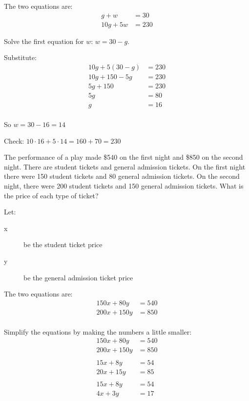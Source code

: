 \documentclass[fleqn,addpoints]{exam}
\begin{document}
\begin{questions}
\begin{solution}[8 cm]
The two equations are:
\begin{align*}
  g + w &= 30 \\
  10g + 5w &= 230
\end{align*}

Solve the first equation for $w$: $w = 30 - g$.

Substitute:
\begin{align*}
  10g + 5(30 - g) &= 230 \\
  10g + 150 - 5g &= 230 \\
  5g + 150 &= 230 \\
  5g  &= 80 \\
  g &= 16 \\
\end{align*}

So $w = 30 - 16 = 14$

Check: $10 \cdot 16 + 5 \cdot 14 = 160 + 70 = 230$

\end{solution}

\question[15] 
The performance of a play made \$540 on the first night and \$850 on the second night.  There are student tickets
and general admission tickets.  On the first night there were 150 student tickets and 80 general admission tickets.  On
the second night, there were 200 student tickets and 150 general admission tickets.  What is the price of each type of
ticket?

\begin{solution}[8 cm]
Let:
\begin{description}
  \item[x] be the student ticket price
  \item[y] be the general admission ticket price
\end{description}

The two equations are:
\begin{align*}
  150x + 80y &= 540 \\
  200x + 150y &= 850 \\
\end{align*}

Simplify the equations by making the numbers a little smaller:
\begin{align*}
  150x + 80y &= 540 \\
  200x + 150y &= 850 \\
  \\
  15x + 8y &= 54 \\
  20x + 15y &= 85 \\
  \\
  15x + 8y &= 54 \\
  4x + 3y &= 17 \\
\end{align*}


\end{solution}
\end{questions}
\end{document}
